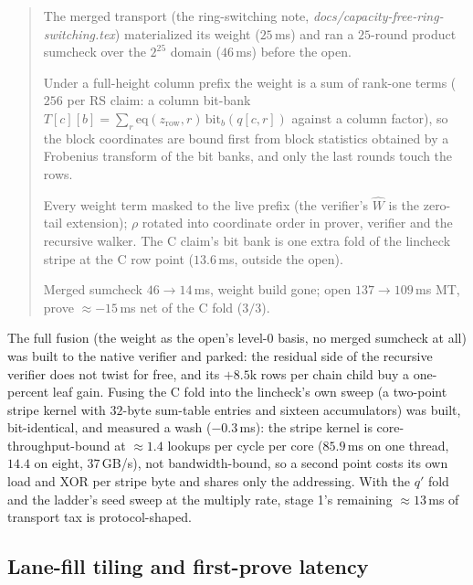\documentclass[11pt]{article}
\newcommand{\eq}{\mathrm{eq}}
\newenvironment{optsummary}{%
  \begin{quote}\small
  \begin{description}
  \setlength{\itemsep}{1pt}\setlength{\parsep}{0pt}\setlength{\topsep}{2pt}
}{%
  \end{description}
  \end{quote}
}
\begin{document}
\begin{optsummary}
\item[Baseline:] The merged transport (the ring-switching note, \emph{docs/capacity-free-ring-switching.tex}) materialized its weight ($25\,$ms) and ran a $25$-round product sumcheck over the $2^{25}$ domain ($46\,$ms) before the open.
\item[Improvement:] Under a full-height column prefix the weight is a sum of rank-one terms ($256$ per RS claim: a column bit-bank $T[c][b] = \sum_r \eq(z_{\mathrm{row}},r)\,\mathrm{bit}_b(q[c,r])$ against a column factor), so the block coordinates are bound first from block statistics obtained by a Frobenius transform of the bit banks, and only the last rounds touch the rows.
\item[Mechanism:] Every weight term masked to the live prefix (the verifier's $\widehat W$ is the zero-tail extension); $\rho$ rotated into coordinate order in prover, verifier and the recursive walker. The C claim's bit bank is one extra fold of the lincheck stripe at the C row point ($13.6\,$ms, outside the open).
\item[Result:] Merged sumcheck $46\to14\,$ms, weight build gone; open $137\to109\,$ms MT, prove $\approx-15\,$ms net of the C fold ($3/3$).
\end{optsummary}

The full fusion (the weight as the open's level-0 basis, no merged
sumcheck at all) was built to the native verifier and parked: the
residual side of the recursive verifier does not twist for free, and
its $+8.5$k rows per chain child buy a one-percent leaf gain. Fusing the
C fold into the lincheck's own sweep (a two-point stripe kernel with
$32$-byte sum-table entries and sixteen accumulators) was built,
bit-identical, and measured a wash ($-0.3\,$ms): the stripe kernel is
core-throughput-bound at $\approx1.4$ lookups per cycle per core
($85.9\,$ms on one thread, $14.4$ on eight, $37\,$GB/s), not
bandwidth-bound, so a second point costs its own load and XOR per
stripe byte and shares only the addressing. With the $q'$ fold and the
ladder's seed sweep at the multiply rate, stage 1's remaining
$\approx13\,$ms of transport tax is protocol-shaped.

\subsection{Lane-fill tiling and first-prove latency}\label{sec:lanefill}
\end{document}
